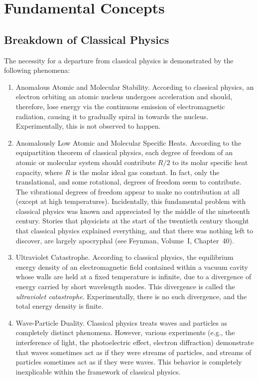 \chapter{Fundamental Concepts}

\section{Breakdown of Classical Physics}
The necessity for a departure from
classical physics is  demonstrated by the following phenomena:
\begin{enumerate}

\item {\sf Anomalous Atomic and Molecular Stability.} According to classical
physics, an electron orbiting an atomic nucleus undergoes acceleration and should, therefore, lose energy via the continuous emission
of electromagnetic radiation, causing it to gradually spiral in towards the nucleus. Experimentally,
this is not observed to happen.

\item {\sf Anomalously Low Atomic and Molecular Specific Heats.} According to
the equipartition theorem of classical physics, each degree of freedom of
an atomic or molecular system should contribute $R/2$ to its molar specific heat capacity, where $R$ is the molar ideal gas constant.
In fact, only the translational, and some rotational, degrees of freedom seem
to contribute. The vibrational degrees of freedom appear to make no contribution
at all
(except at high temperatures). Incidentally, this fundamental 
problem with classical physics was known and appreciated by the middle of the
nineteenth century. Stories that physicists at the start of the twentieth century thought that
classical physics explained everything, and that there was nothing left to
discover, are largely apocryphal (see  Feynman, Volume~I, Chapter~40).

\item {\sf Ultraviolet Catastrophe.} According to classical physics, the equilibrium energy
density of an electromagnetic field contained within a vacuum cavity whose walls are held at a fixed temperature is infinite, due to a divergence of
energy carried by short wavelength modes. This divergence is called the {\em ultraviolet catastrophe}. Experimentally, there is no such
divergence,  and the total energy density is finite. 

\item {\sf Wave-Particle Duality.} Classical physics  treats waves and 
particles as completely distinct phenomena. However, various experiments ({\rm e.g.}, the interference of light, the photoelectric effect,
electron diffraction) demonstrate that waves sometimes act as if they
were streams of particles, and streams of particles sometimes act as if they 
were waves. This behavior is completely inexplicable within the framework of
classical physics. 
\end{enumerate}

